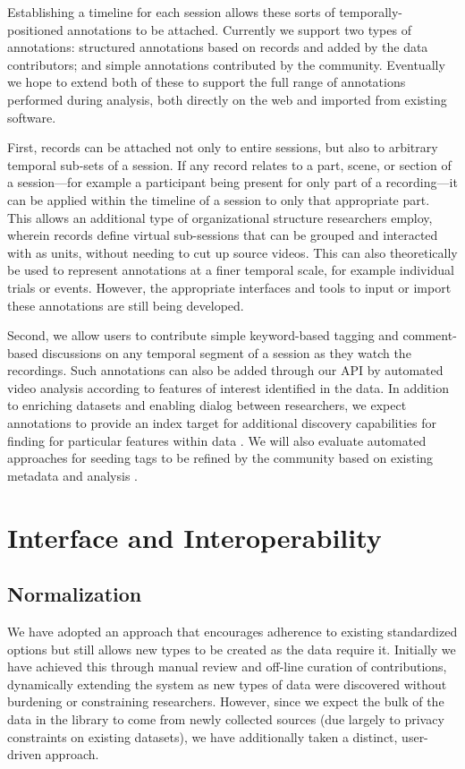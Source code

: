 \documentclass{sig-alternate}
\begin{document}
Establishing a timeline for each session allows these sorts of temporally-positioned annotations to be attached.
Currently we support two types of annotations: structured annotations based on records and added by the data contributors; and simple annotations contributed by the community.
Eventually we hope to extend both of these to support the full range of annotations performed during analysis, both directly on the web and imported from existing software.

First, records can be attached not only to entire sessions, but also to arbitrary temporal sub-sets of a session.
If any record relates to a part, scene, or section of a session---for example a participant being present for only part of a recording---it can be applied within the timeline of a session to only that appropriate part.
This allows an additional type of organizational structure researchers employ, wherein records define virtual sub-sessions that can be grouped and interacted with as units, without needing to cut up source videos.
This can also theoretically be used to represent annotations at a finer temporal scale, for example individual trials or events.
However, the appropriate interfaces and tools to input or import these annotations are still being developed.

Second, we allow users to contribute simple keyword-based tagging and comment-based discussions on any temporal segment of a session as they watch the recordings.
Such annotations can also be added through our API by automated video analysis according to features of interest identified in the data.
In addition to enriching datasets and enabling dialog between researchers, we expect annotations to provide an index target for additional discovery capabilities for finding for particular features within data \cite{Lanagan_Smeaton_2012}.
We will also evaluate automated approaches for seeding tags to be refined by the community based on existing metadata and analysis \cite{Yang_Lu_Giles_2011,Giles2013}.

\section{Interface and Interoperability}

\subsection{Normalization}

We have adopted an approach that encourages adherence to existing standardized options but still allows new types to be created as the data require it.
Initially we have achieved this through manual review and off-line curation of contributions, dynamically extending the system as new types of data were discovered without burdening or constraining researchers.
However, since we expect the bulk of the data in the library to come from newly collected sources (due largely to privacy constraints on existing datasets), we have additionally taken a distinct, user-driven approach.
\end{document}
